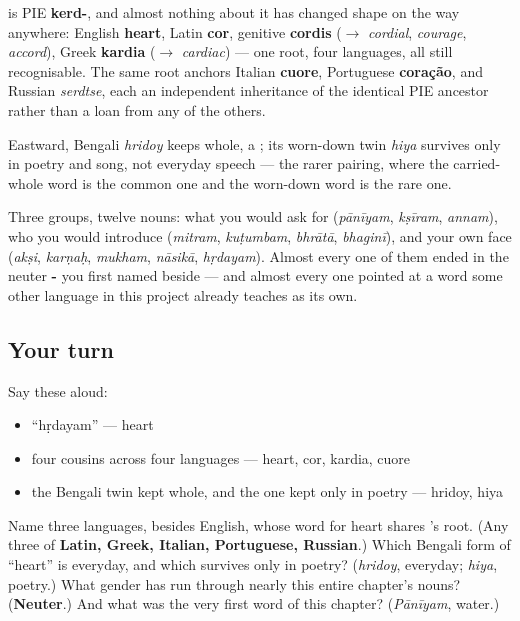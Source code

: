 \begin{cousinweb}
\textbf{} is PIE \textbf{kerd-}, and almost nothing about it has changed shape on the way anywhere: English \textbf{heart}, Latin \textbf{cor}, genitive \textbf{cordis} ($\to$ \emph{cordial}, \emph{courage}, \emph{accord}), Greek \textbf{kardia} ($\to$ \emph{cardiac}) — one root, four languages, all still recognisable. The same root anchors Italian \textbf{cuore}, Portuguese \textbf{coração}, and Russian \emph{serdtse}, each an independent inheritance of the identical PIE ancestor rather than a loan from any of the others.

Eastward, Bengali \emph{hridoy} keeps  whole, a ; its worn-down twin \emph{hiya} survives only in poetry and song, not everyday speech — the rarer pairing, where the carried-whole word is the common one and the worn-down word is the rare one.
\end{cousinweb}

\begin{grammarlens}[title={What you've built: twelve words, three rooms}]
Three groups, twelve nouns: what you would ask for (\emph{pānīyam}, \emph{kṣīram}, \emph{annam}), who you would introduce (\emph{mitram}, \emph{kuṭumbam}, \emph{bhrātā}, \emph{bhaginī}), and your own face (\emph{akṣi}, \emph{karṇaḥ}, \emph{mukham}, \emph{nāsikā}, \emph{hṛdayam}). Almost every one of them ended in the neuter \textbf{-} you first named beside \textbf{} — and almost every one pointed at a word some other language in this project already teaches as its own.
\end{grammarlens}

\subsection*{Your turn}
Say these aloud:

\begin{itemize}
\raggedright
  \item \textquotedblleft{}hṛdayam\textquotedblright{} — heart
  \item four cousins across four languages — heart, cor, kardia, cuore
  \item the Bengali twin kept whole, and the one kept only in poetry — hridoy, hiya
\end{itemize}

\begin{tcolorbox}[breakable,colback=teal!4,colframe=teal!35!black,title={Before you move on}]
Name three languages, besides English, whose word for heart shares 's root. (Any three of \textbf{Latin, Greek, Italian, Portuguese, Russian}.) Which Bengali form of \textquotedblleft{}heart\textquotedblright{} is everyday, and which survives only in poetry? (\emph{hridoy}, everyday; \emph{hiya}, poetry.) What gender has run through nearly this entire chapter's nouns? (\textbf{Neuter}.) And what was the very first word of this chapter? (\emph{Pānīyam}, water.)
\end{tcolorbox}
